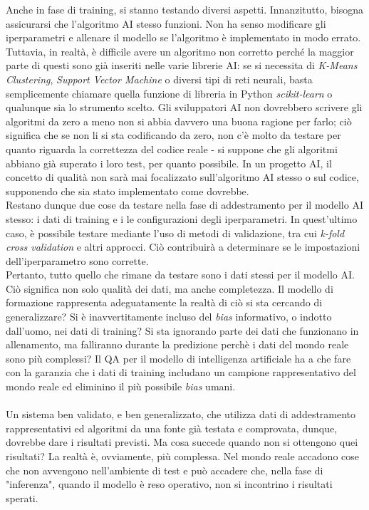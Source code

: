 \documentclass[a4paper,12pt]{report}
\begin{document}
Anche in fase di training, si stanno testando diversi aspetti. Innanzitutto, bisogna assicurarsi che l'algoritmo AI stesso funzioni. Non ha senso modificare gli iperparametri e allenare il modello se l'algoritmo è implementato in modo errato. Tuttavia, in realtà, è difficile avere un algoritmo non corretto perché la maggior parte di questi sono già inseriti nelle varie librerie AI: se si necessita di \textit{K-Means Clustering}, \textit{Support Vector Machine} o diversi tipi di reti neurali, basta semplicemente chiamare quella funzione di libreria in Python \textit{scikit-learn} o qualunque sia lo strumento scelto. Gli sviluppatori AI non dovrebbero scrivere gli algoritmi da zero a meno non si abbia davvero una buona ragione per farlo; ciò significa che se non li si sta codificando da zero, non c'è molto da testare per quanto riguarda la correttezza del codice reale - si suppone che gli algoritmi abbiano già superato i loro test, per quanto possibile. In un progetto AI, il concetto di qualità non sarà mai focalizzato sull'algoritmo AI stesso o sul codice, supponendo che sia stato implementato come dovrebbe.\\
Restano dunque due cose da testare nella fase di addestramento per il modello AI stesso: i dati di training e i le configurazioni degli iperparametri. In quest'ultimo caso, è possibile testare mediante l'uso di metodi di validazione, tra cui \textit{k-fold cross validation} e altri approcci. Ciò contribuirà a determinare se le impostazioni dell'iperparametro sono corrette.\\
Pertanto, tutto quello che rimane da testare sono i dati stessi per il modello AI. Ciò significa non solo qualità dei dati, ma anche completezza. Il modello di formazione rappresenta adeguatamente la realtà di ciò si sta cercando di generalizzare? Si è inavvertitamente incluso del \textit{bias} informativo, o indotto dall'uomo, nei dati di training? Si sta ignorando parte dei dati che funzionano in allenamento, ma falliranno durante la predizione perchè i dati del mondo reale sono più complessi? Il QA per il modello di intelligenza artificiale ha a che fare con la garanzia che i dati di training includano un campione rappresentativo del mondo reale ed eliminino il più possibile \textit{bias} umani.\\~\\
Un sistema ben validato, e ben generalizzato, che utilizza dati di addestramento rappresentativi ed algoritmi da una fonte già testata e comprovata, dunque, dovrebbe dare i risultati previsti. Ma cosa succede quando non si ottengono quei risultati? La realtà è, ovviamente, più complessa. Nel mondo reale accadono cose che non avvengono nell'ambiente di test e può accadere che, nella fase di "inferenza", quando il modello è reso operativo, non si incontrino i risultati sperati.\\
\end{document}
